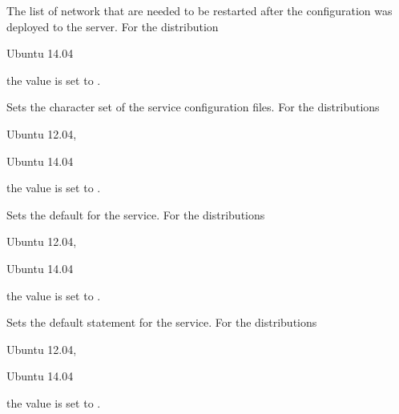 
The list of network  that are needed to be restarted after 
the configuration was deployed to the server. 
For the distribution
\begin{inparaitem}
\item[\TheDistribution{ubuntu}] Ubuntu 14.04
\end{inparaitem}
the value is set to .


Sets the character set  of the service configuration files. 
For the distributions
\begin{inparaitem}
\item[\TheDistribution{ubuntu}] Ubuntu 12.04,
\item[\TheDistribution{ubuntu}] Ubuntu 14.04
\end{inparaitem}
the value is set to .


Sets the default  for the service. 
For the distributions
\begin{inparaitem}
\item[\TheDistribution{ubuntu}] Ubuntu 12.04,
\item[\TheDistribution{ubuntu}] Ubuntu 14.04
\end{inparaitem}
the value is set to .


Sets the default  statement for the service. 
For the distributions
\begin{inparaitem}
\item[\TheDistribution{ubuntu}] Ubuntu 12.04,
\item[\TheDistribution{ubuntu}] Ubuntu 14.04
\end{inparaitem}
the value is set to .


